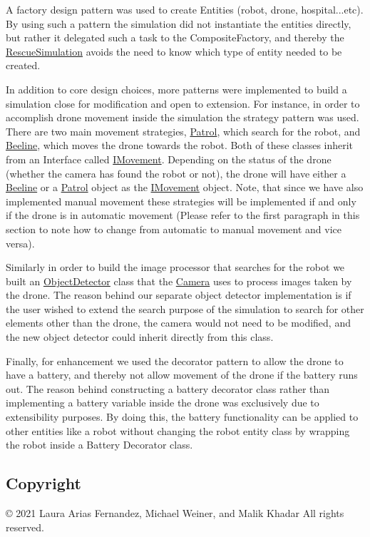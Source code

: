 A factory design pattern was used to create Entities (robot, drone, hospital...etc). By using such a pattern the simulation did not instantiate the entities directly, but rather it delegated such a task to the Composite\+Factory, and thereby the \hyperlink{classRescueSimulation}{Rescue\+Simulation} avoids the need to know which type of entity needed to be created.



In addition to core design choices, more patterns were implemented to build a simulation close for modification and open to extension. For instance, in order to accomplish drone movement inside the simulation the strategy pattern was used. There are two main movement strategies, \hyperlink{classPatrol}{Patrol}, which search for the robot, and \hyperlink{classBeeline}{Beeline}, which moves the drone towards the robot. Both of these classes inherit from an Interface called \hyperlink{classIMovement}{I\+Movement}. Depending on the status of the drone (whether the camera has found the robot or not), the drone will have either a \hyperlink{classBeeline}{Beeline} or a \hyperlink{classPatrol}{Patrol} object as the \hyperlink{classIMovement}{I\+Movement} object. Note, that since we have also implemented manual movement these strategies will be implemented if and only if the drone is in automatic movement (Please refer to the first paragraph in this section to note how to change from automatic to manual movement and vice versa).



Similarly in order to build the image processor that searches for the robot we built an \hyperlink{classObjectDetector}{Object\+Detector} class that the \hyperlink{classCamera}{Camera} uses to process images taken by the drone. The reason behind our separate object detector implementation is if the user wished to extend the search purpose of the simulation to search for other elements other than the drone, the camera would not need to be modified, and the new object detector could inherit directly from this class.



Finally, for enhancement we used the decorator pattern to allow the drone to have a battery, and thereby not allow movement of the drone if the battery runs out. The reason behind constructing a battery decorator class rather than implementing a battery variable inside the drone was exclusively due to extensibility purposes. By doing this, the battery functionality can be applied to other entities like a robot without changing the robot entity class by wrapping the robot inside a Battery Decorator class.



\subsection*{Copyright}

\copyright{} 2021 Laura Arias Fernandez, Michael Weiner, and Malik Khadar All rights reserved. 